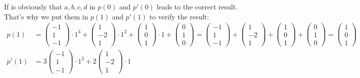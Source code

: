 \documentclass{article}
\begin{document}
        If is obviously that $a,b,c,d$ in $p(0)$ and $p'(0)$ leads to the correct result.
        That's why we put them in $p(1)$ and $p'(1)$ to verify the result:
        \begin{align}
            p(1) &= \left(\begin{matrix} -1\\1\\-1 \end{matrix}\right) \cdot 1^3 + \left(\begin{matrix} 1\\-2\\1 \end{matrix}\right) \cdot 1^2
                + \left(\begin{matrix} 1\\0\\1 \end{matrix}\right) \cdot 1 + \left(\begin{matrix} 0\\1\\0 \end{matrix}\right)
                = \left(\begin{matrix} -1\\1\\-1 \end{matrix}\right) + \left(\begin{matrix} 1\\-2\\1 \end{matrix}\right)
                + \left(\begin{matrix} 1\\0\\1 \end{matrix}\right) + \left(\begin{matrix} 0\\1\\0 \end{matrix}\right)
                = \left(\begin{matrix} 1\\0\\1 \end{matrix}\right)\\
            p'(1) &= 3 \left(\begin{matrix} -1\\1\\-1 \end{matrix}\right) \cdot 1^2 + 2 \left(\begin{matrix} 1\\-2\\1 \end{matrix}\right) \cdot 1

\end{align}
\end{document}
